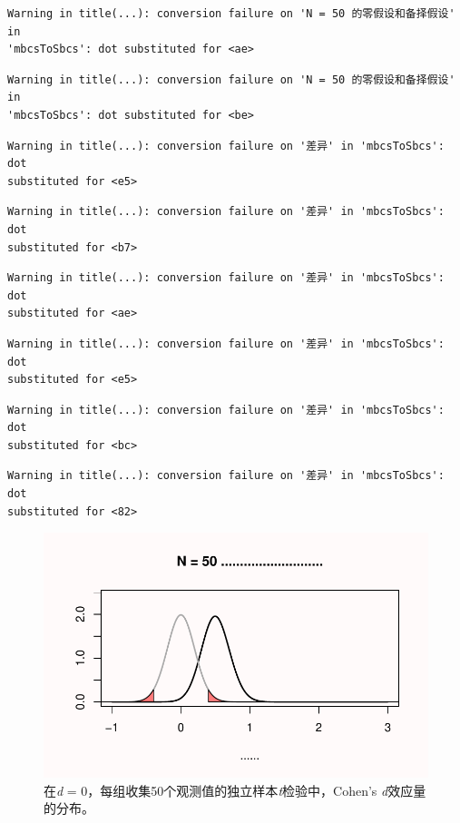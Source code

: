 \documentclass[
  letterpaper,
  DIV=11,
  numbers=noendperiod]{scrreprt}
\begin{document}
\begin{verbatim}
Warning in title(...): conversion failure on 'N = 50 的零假设和备择假设' in
'mbcsToSbcs': dot substituted for <ae>
\end{verbatim}

\begin{verbatim}
Warning in title(...): conversion failure on 'N = 50 的零假设和备择假设' in
'mbcsToSbcs': dot substituted for <be>
\end{verbatim}

\begin{verbatim}
Warning in title(...): conversion failure on '差异' in 'mbcsToSbcs': dot
substituted for <e5>
\end{verbatim}

\begin{verbatim}
Warning in title(...): conversion failure on '差异' in 'mbcsToSbcs': dot
substituted for <b7>
\end{verbatim}

\begin{verbatim}
Warning in title(...): conversion failure on '差异' in 'mbcsToSbcs': dot
substituted for <ae>
\end{verbatim}

\begin{verbatim}
Warning in title(...): conversion failure on '差异' in 'mbcsToSbcs': dot
substituted for <e5>
\end{verbatim}

\begin{verbatim}
Warning in title(...): conversion failure on '差异' in 'mbcsToSbcs': dot
substituted for <bc>
\end{verbatim}

\begin{verbatim}
Warning in title(...): conversion failure on '差异' in 'mbcsToSbcs': dot
substituted for <82>
\end{verbatim}

\begin{figure}

{\centering \includegraphics[width=1\textwidth,height=\textheight]{01-pvalue_files/figure-pdf/fig-fig134-1.pdf}

}

\caption{\label{fig-fig134}在\emph{d} =
0，每组收集50个观测值的独立样本\emph{t}检验中，Cohen's
\emph{d}效应量的分布。}

\end{figure}
\end{document}
